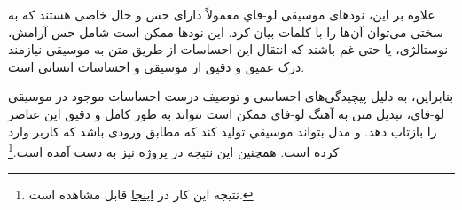 علاوه بر این، نودهای موسیقی ﻟﻮ-ﻓﺎﻱ معمولاً دارای حس و حال خاصی هستند که به سختی می‌توان آن‌ها را با کلمات بیان کرد. این نودها ممکن است شامل حس آرامش، نوستالژی، یا حتی غم باشند که انتقال این احساسات از طریق متن به موسیقی نیازمند درک عمیق و دقیق از موسیقی و احساسات انسانی است.

بنابراین، به دلیل پیچیدگی‌های احساسی و توصیف درست احساسات موجود در موسیقی ﻟﻮ-ﻓﺎﻱ، تبدیل متن به آهنگ ﻟﻮ-ﻓﺎﻱ ممکن است نتواند به طور کامل و دقیق این عناصر را بازتاب دهد. و مدل بتواند موسیقي تولید کند که مطابق ورودی باشد که کاربر وارد کرده است. همچنین این نتیجه در پروژه  \cite{Zhang} نیز به دست آمده است.\footnote{نتیجه این کار در \href{https://github.com/jacbz/Lofi/tree/main/model\#lyrics2lofi}{اینجا} قابل مشاهده است.}
